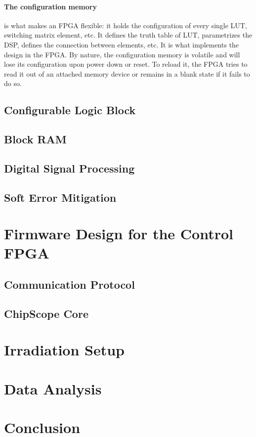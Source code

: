       \paragraph{The configuration memory} is what makes an FPGA flexible: it holds the configuration of every single LUT, switching matrix element, etc. It defines the truth table of LUT, parametrizes the DSP, defines the connection between elements, etc. It is what implements the design in the FPGA. By nature, the configuration memory is volatile and will lose its configuration upon power down or reset. To reload it, the FPGA tries to read it out of an attached memory device or remains in a blank state if it fails to do so.

    \subsection{Configurable Logic Block}

    \subsection{Block RAM}

    \subsection{Digital Signal Processing}

    \subsection{Soft Error Mitigation}

  \section{Firmware Design for the Control FPGA}

    \subsection{Communication Protocol}

    \subsection{ChipScope Core}

  \section{Irradiation Setup}

  \section{Data Analysis}

  \section{Conclusion}

